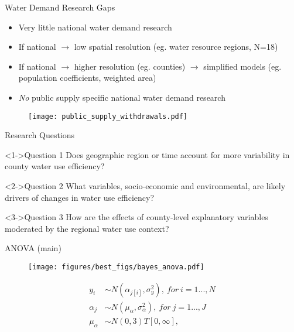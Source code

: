 \documentclass[pdf]{beamer}
\begin{document}

\begin{frame}{Water Demand Research Gaps}
\begin{itemize} 
\item Very little national water demand research
\item If national $\longrightarrow$ low spatial resolution (eg. water resource regions, N=18) 
\item If national $\longrightarrow$ higher resolution (eg. counties) $\longrightarrow$ simplified models (eg. population coefficients, weighted area)
\item \textit{No} public supply specific national water demand research
\end{itemize}
\vspace{-1cm}
\begin{figure}[ht]
\begin{center}
\texttt{[image: public\_supply\_withdrawals.pdf]}
\end{center}
\end{figure}

\end{frame}


\begin{frame}{Research Questions}
\begin{block}<1->{Question 1}
Does geographic region or time account for more variability in county water use efficiency? 
\end{block}
\vspace{0.5 cm}
\begin{block}<2->{Question 2}
What variables, socio-economic and environmental, are likely drivers of changes in water use efficiency?
\end{block}
\vspace{0.5 cm}
\begin{block}<3->{Question 3}
How are the effects of county-level explanatory variables moderated by the regional water use context?
\end{block}
\end{frame}


\begin{frame}{ANOVA (main)}
\begin{figure}[ht]
\begin{center}
\texttt{[image: figures/best\_figs/bayes\_anova.pdf]}
\end{center}
\end{figure}
\vspace{-0.5 cm}
\footnotesize
\begin{align*} 
y_i &\sim  N(\alpha_{j[i]},\sigma^2_y), ~ for ~ i=1...,N \\
\alpha_j &\sim  N(\mu_\alpha,\sigma^2_\alpha), ~ for ~ j=1...,J \\
\mu_\alpha &\sim N(0,3)T[0,\infty],
\end{align*}
\normalsize
\end{frame}
\end{document}
